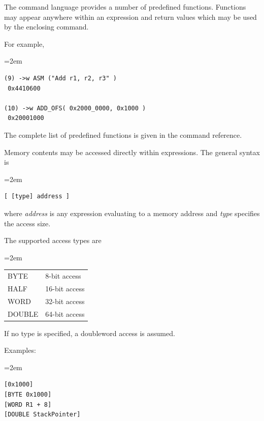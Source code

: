 
The command language provides a number of predefined functions. Functions may appear anywhere within an expression and return values which may be used by the enclosing command.

For example,

\begin{list}{}{\leftmargin=2em}
\item
\begin{verbatim}
(9) ->w ASM ("Add r1, r2, r3" )
 0x4410600
 
(10) ->w ADD_OFS( 0x2000_0000, 0x1000 )
 0x20001000
\end{verbatim}
\end{list}

The complete list of predefined functions is given in the command reference.


Memory contents may be accessed directly within expressions. The general syntax is

\begin{list}{}{\leftmargin=2em}
\item
\begin{verbatim}
[ [type] address ]
\end{verbatim}
\end{list}

where \textit{address} is any expression evaluating to a memory address and \textit{type} specifies the access size.

The supported access types are

\begin{list}{}{\leftmargin=2em}
\item
\begin{tabular}{ll}
BYTE   & 8-bit access \\
HALF   & 16-bit access \\
WORD   & 32-bit access \\
DOUBLE & 64-bit access
\end{tabular}
\end{list}

If no type is specified, a doubleword access is assumed.

Examples:

\begin{list}{}{\leftmargin=2em}
\item
\begin{verbatim}
[0x1000]
[BYTE 0x1000]
[WORD R1 + 8]
[DOUBLE StackPointer]
\end{verbatim}
\end{list}

